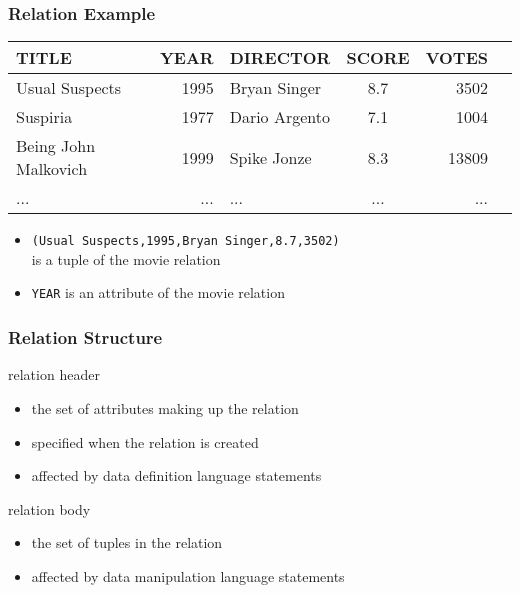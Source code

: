 \documentclass[dvipsnames]{beamer}
\theoremstyle{plain}
\begin{document}
\begin{frame}
  \frametitle{Relation Example}

  \begin{example}
    \begin{tiny}
    \begin{table}
      \begin{tabular}{|l|r|l|c|r|r|}\hline
TITLE                & YEAR & DIRECTOR      & SCORE & VOTES\\\hline\hline
Usual Suspects       & 1995 & Bryan Singer  &   8.7 &  3502\\\hline
Suspiria             & 1977 & Dario Argento &   7.1 &  1004\\\hline
Being John Malkovich & 1999 & Spike Jonze   &   8.3 & 13809\\\hline
...                  &  ... & ...           &   ... &   ...\\\hline
      \end{tabular}
    \end{table}
    \end{tiny}

    \pause
    \begin{itemize}
      \item \texttt{(Usual Suspects,1995,Bryan Singer,8.7,3502)}\\
        is a tuple of the movie relation
      \item \texttt{YEAR} is an attribute of the movie relation
    \end{itemize}
  \end{example}
\end{frame}

\begin{frame}
  \frametitle{Relation Structure}

  \begin{block}{relation header}
    \begin{itemize}
      \item the set of attributes making up the relation
      \item specified when the relation is created
      \item affected by data definition language statements
    \end{itemize}
  \end{block}

  \pause
  \begin{block}{relation body}
    \begin{itemize}
      \item the set of tuples in the relation
      \item affected by data manipulation language statements
    \end{itemize}
  \end{block}
\end{frame}
\end{document}
